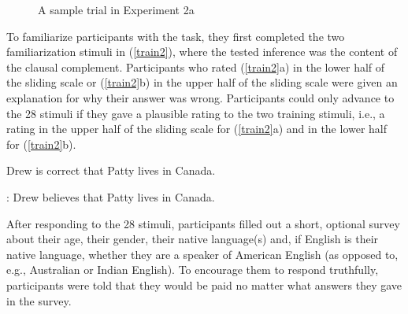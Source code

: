 \documentclass[11pt,fleqn]{article}
\newcommand{\6}{\mbox{$[\hspace*{-.6mm}[$}}
\newcommand{\9}{\mbox{$]\hspace*{-.6mm}]$}}
\begin{document}
\begin{figure}[H]
\begin{center}
\end{center}
\caption{A sample trial in Experiment 2a}\label{f-trial-exp3}
\end{figure}

To familiarize participants with the task, they first completed the two familiarization stimuli in (\ref{train2}), where the tested inference was the content of the clausal complement. Participants who rated (\ref{train2}a) in the lower half of the sliding scale or (\ref{train2}b) in the upper half of the sliding scale were given an explanation for why their answer was wrong. Participants could only advance to the 28 stimuli if they gave a plausible rating to the two training stimuli, i.e., a rating in the upper half of the sliding scale for (\ref{train2}a) and in the lower half for (\ref{train2}b).

\begin{exe}
\ex\label{train2}
\begin{xlist}
 Drew is correct that Patty lives in Canada. 

: Drew believes that Patty lives in Canada.
\end{xlist}
\end{exe}

After responding to the 28 stimuli, participants filled out a short, optional survey about their age, their gender, their native language(s) and, if English is their native language, whether they are a speaker of American English (as opposed to, e.g., Australian or Indian English). To encourage them to respond truthfully, participants were told that they would be paid no matter what answers they gave in the survey.
\end{document}
